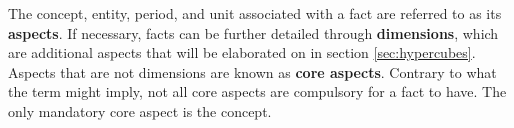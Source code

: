 
The concept, entity, period, and unit associated with a fact are referred to as its \textbf{aspects}.
If necessary, facts can be further detailed through \textbf{dimensions}, which are additional aspects that will be elaborated on in section \ref{sec:hypercubes}.
Aspects that are not dimensions are known as \textbf{core aspects}.
Contrary to what the term might imply, not all core aspects are compulsory for a fact to have.
The only mandatory core aspect is the concept.
